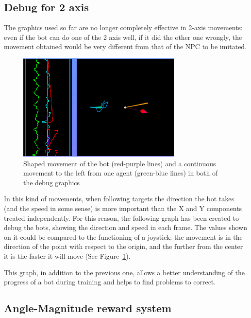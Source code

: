 \pagebreak

\subsection{Debug for 2 axis} %

The graphics used so far are no longer completely effective in 2-axis movements: even if the bot can do one of the 2 axis well, if it did the other one wrongly, the movement obtained would be very different from that of the NPC to be imitated.

\begin{figure}[h]
  \centering
		\includegraphics[width=.8\textwidth]{img/debug2axis.png}
  \caption{Shaped movement of the bot (red-purple lines) and a continuous movement to the left from one agent (green-blue lines) in both of the debug graphics}
  \label{fig:debug2axis}
\end{figure}

In this kind of movements, when following targets the direction the bot takes (and the speed in some sense) is more important than the X and Y components treated independently. For this reason, the following graph has been created to debug the bots, showing the direction and speed in each frame. The values shown on it could be compared to the functioning of a joystick: the movement is in the direction of the point with respect to the origin, and the further from the center it is the faster it will move (See Figure~\ref{fig:debug2axis}).

This graph, in addition to the previous one, allows a better understanding of the progress of a bot during training and helps to find problems to correct.

\subsection{Angle-Magnitude reward system} %


